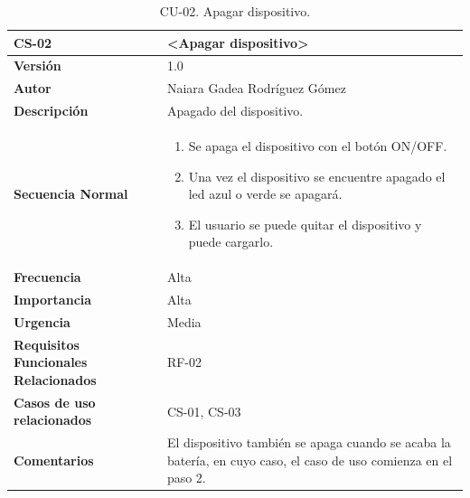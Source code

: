 \begin{table}[h!]
\centering
\begin{tabular}{ |m{3cm}|m{11cm}|  } 
\hline
\cellcolor[HTML]{B9E3F0}\textbf{CS-02} & \cellcolor[HTML]{B9E3F0}\textbf{<Apagar dispositivo>}\\

\hline
\cellcolor[HTML]{EFEFEF}\textbf{Versión}             & 1.0  \\
\hline
\cellcolor[HTML]{EFEFEF}\textbf{Autor}                & Naiara Gadea Rodríguez Gómez\\
\hline
\cellcolor[HTML]{EFEFEF}\textbf{Descripción}                & {Apagado del dispositivo.}\\
\hline
\cellcolor[HTML]{EFEFEF}\textbf{Secuencia \newline Normal}                &                 
        \begin{enumerate}
			\def\labelenumi{\arabic{enumi}.}
			\tightlist
			\item Se apaga el dispositivo con el botón ON/OFF.
			\item Una vez el dispositivo se encuentre apagado el led azul o verde se apagará.
                \item El usuario se puede quitar el dispositivo y puede cargarlo.
		\end{enumerate}\\
\hline
\cellcolor[HTML]{EFEFEF}\textbf{Frecuencia}                & Alta\\
\hline
\cellcolor[HTML]{EFEFEF}\textbf{Importancia}                & Alta\\
\hline
\cellcolor[HTML]{EFEFEF}\textbf{Urgencia}                & Media\\
\hline
\cellcolor[HTML]{EFEFEF}\textbf{Requisitos Funcionales Relacionados}                & {RF-02}\\
\hline
\cellcolor[HTML]{EFEFEF}\textbf{Casos de uso relacionados}                & {CS-01, CS-03}\\
\hline
\cellcolor[HTML]{EFEFEF}\textbf{Comentarios}                & {El dispositivo también se apaga cuando se acaba la batería, en cuyo caso, el caso de uso comienza en el paso 2. }\\
\hline
\end{tabular}
\caption{CU-02. Apagar dispositivo.}
\end{table}

